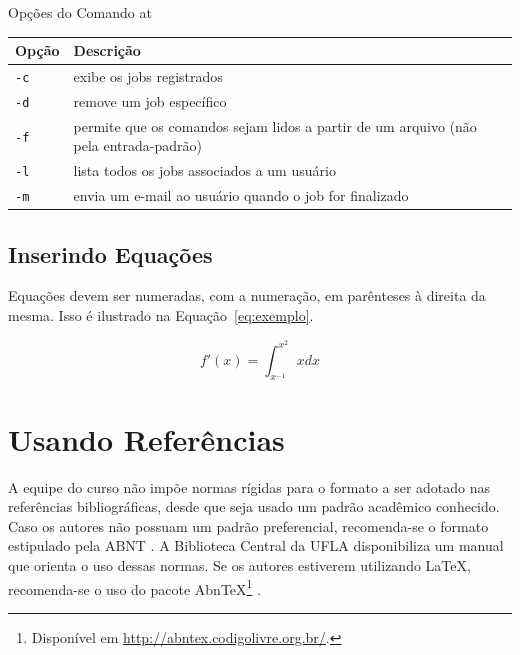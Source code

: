 \begin{quadro}[h!]
\begin{center}
\caption{Opções do Comando {\ttfamily at}}\label{tab:maisum}
  \begin{tabular}{|l|p{9cm}|}
    \hline 
    \rowcolor[gray]{.9}
    \bf Opção & \bf Descrição\\
    \hline
    \tt -c & exibe os jobs registrados\\
    \hline
    \tt -d & remove um job específico\\
    \hline
    \tt -f & permite que os comandos sejam lidos a partir de um arquivo (não pela entrada-padrão)\\
    \hline
    \tt -l & lista todos os jobs associados a um usuário\\
    \hline
    \tt -m & envia um e-mail ao usuário quando o job for finalizado\\
    \hline
    \end{tabular}
\end{center}
\end{quadro}

\subsection{Inserindo Equações}

Equações devem ser numeradas, com a numeração, em parênteses à direita da mesma. Isso é ilustrado na Equação~\ref{eq:exemplo}.

\begin{equation}
\label{eq:exemplo}
f'(x) = \int^{x^2}_{x^{-1}} xdx 
\end{equation}


\section{Usando Referências}
A equipe do curso não impõe normas rígidas para o formato a ser adotado nas referências bibliográficas, desde que seja usado um padrão acadêmico conhecido. Caso os autores não possuam um padrão preferencial, recomenda-se o formato estipulado pela ABNT \cite{NBR6023:2002}. A Biblioteca Central da UFLA disponibiliza um manual \cite{BIBUFLA2001} que orienta o uso dessas normas. Se os autores estiverem utilizando \LaTeX, recomenda-se o uso do pacote Abn\TeX\footnote{Disponível em \url{http://abntex.codigolivre.org.br/}.} \cite{Weber2003}. 

